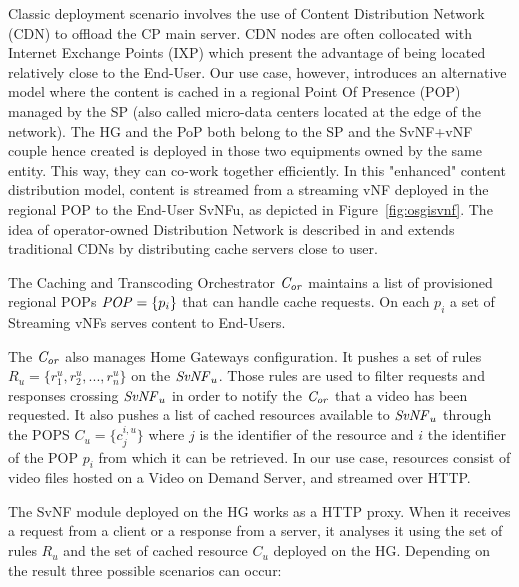 Classic deployment scenario involves the use of Content Distribution Network (CDN) to offload the CP main server.
CDN nodes are often collocated with Internet Exchange Points (IXP) which present the advantage of being located relatively close to the End-User. Our use case, however, introduces an alternative model where the content is cached in a regional Point Of Presence (POP) managed by the SP (also called micro-data centers located at the edge of the network). The HG and the PoP both belong to the SP and the SvNF+vNF couple hence created is deployed in those two equipments owned by the same entity. This way, they can co-work together efficiently. In this "enhanced" content distribution model, content is streamed from a streaming vNF deployed in the regional POP to the End-User SvNFu, as depicted in Figure~\ref{fig:osgisvnf}.
The idea of operator-owned Distribution Network is described in \cite{spagna_design_2013} and extends traditional CDNs by distributing cache servers close to user.

The Caching and Transcoding Orchestrator  $\mathit{C_{or}}$ maintains a list of provisioned regional POPs \(\mathit{POP}=\{p_{i}\}\) that can handle cache requests. On each $p_{i}$ a set of Streaming vNFs serves content to End-Users.

The $\mathit{C_{or}}$ also manages Home Gateways configuration. It pushes a set of rules \(R_{u}=\{r^{u}_{1},r^{u}_{2},...,r^{u}_{n}\}\) on the $\mathit{SvNF}_{u}$. 
Those rules are used to filter requests and responses crossing $\mathit{SvNF}_{u}$ in order to notify the $\mathit{C_{or}}$ that a video has been requested.
It also pushes a list of cached resources available to $\mathit{SvNF}_{u}$ through the POPS $C_{u}=\{c^{i,u}_{j} \}$ where $j$ is the identifier of the resource and $i$ the identifier of the POP $p_{i}$ from which it can be retrieved. In our use case, resources consist of video files hosted on a Video on Demand Server, and streamed over HTTP.

The SvNF module deployed on the HG works as a HTTP proxy.
When it receives a request from a client or a response from a server, it analyses it using the set of rules \(R_{u}\) and the set of cached resource $C_{u}$ deployed on the HG.
Depending on the result three possible scenarios can occur:


